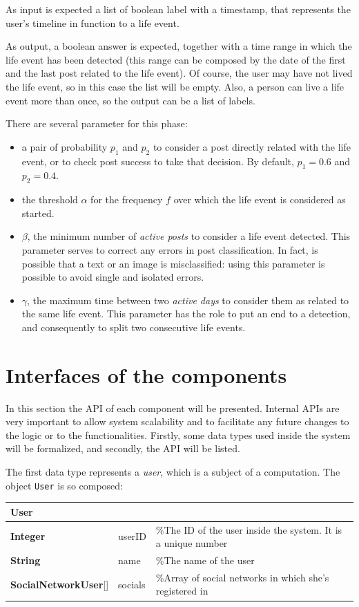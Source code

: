 As input is expected a list of boolean label with a timestamp, that represents the user's timeline in function to a life event.

As output, a boolean answer is expected, together with a time range in which the life event has been detected (this range can be composed by the date of the first and the last post related to the life event). Of course, the user may have not lived the life event, so in this case the list will be empty. Also, a person can live a life event more than once, so the output can be a list of labels.

There are several parameter for this phase: 
\begin{itemize}
\item a pair of probability $p_1$ and $p_2$ to consider a post directly related with the life event, or to check post success to take that decision. By default, $p_1 = 0.6$ and $p_2 = 0.4$.
\item the threshold $\alpha$ for the frequency $f$ over which the life event is considered as started.
\item $\beta$, the minimum number of \emph{active posts} to consider a life event detected. This parameter serves to correct any errors in post classification. In fact, is possible that a text or an image is misclassified: using this parameter is possible to avoid single and isolated errors.
\item $\gamma$, the maximum time between two \emph{active days} to consider them as related to the same life event. This parameter has the role to put an end to a detection, and consequently to split two consecutive life events.
\end{itemize}

\section{Interfaces of the components}
\label{sec:apis}
In this section the API of each component will be presented. Internal APIs are very important to allow system scalability and to facilitate any future changes to the logic or to the functionalities. Firstly, some data types used inside the system will be formalized, and secondly, the API will be listed.

The first data type represents a \emph{user}, which is a subject of a computation. The object \texttt{User} is so composed:

\begin{center}
\label{tab:user}
\begin{tabular}{lll}
\hline
User & & \\
\hline
\textbf{Integer} & userID & \%The ID of the user inside the system. It is a unique number \\
\textbf{String} & name & \%The name of the user \\
\textbf{SocialNetworkUser}[] & socials & \%Array of social networks in which she's registered in \\
\hline
\end{tabular}
\end{center}

